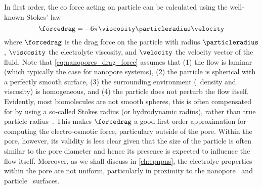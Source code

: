 In first order, the \gls{eo} force acting on particle can be calculated using the well-known Stokes' law
%
\begin{equation}\label{eq:nanopores_drag_force}
  \forcedrag = - 6 \pi \viscosity \particleradius \velocity
\end{equation}
%
where $\forcedrag$ is the drag force on the particle with radius $\particleradius$, $\viscosity$ the
electrolyte viscosity, and $\velocity$ the velocity vector of the fluid. Note that
\cref{eq:nanopores_drag_force} assumes that (1) the flow is laminar (which typically the case for nanopore
systems\footnotemark),%
%
%
%
(2) the particle is spherical with a perfectly smooth surface, (3) the surrounding environment (\ie~density
and viscosity) is homogeneous, and (4) the particle does not perturb the flow itself. Evidently, most
biomolecules are not smooth spheres, this is often compensated for by using a so-called Stokes radius (or
hydrodynamic radius), rather than true particle radius~\cite{Ortega-2011}. This makes $\forcedrag$ a good
first order approximation for computing the electro-osmotic force, particulary outside of the pore. Within the
pore, however, its validity is less clear given that the size of the particle is often similar to the pore
diameter and hence its presence is expected to influence the flow itself. Moreover, as we shall discuss in
\cref{ch:epnpns}, the electrolye properties within the pore are not uniform, particularly in proximity to the
nanopore~\cite{Qiao-Aluru-2003,Vo-2016,Hsu-2017,Ye-2011} and particle~\cite{Pronk-2014,Makarov-1998} surfaces.

